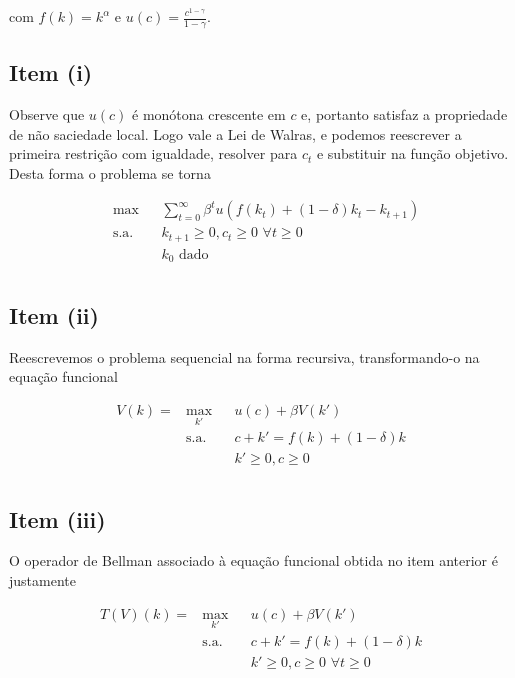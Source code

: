 \documentclass{article}
\begin{document}
com $f(k) = k^\alpha$ e $u(c) = \frac{c^{1-\gamma}}{1-\gamma}$.


\subsection*{Item (i)}

Observe que $u(c)$ é monótona crescente em $c$ e, portanto satisfaz a propriedade de não saciedade local.
Logo vale a Lei de Walras, e podemos reescrever a primeira restrição com igualdade,
resolver para $c_t$ e substituir na função objetivo. Desta forma o problema se torna 

\begin{equation}
\begin{aligned}
& \max & & \sum_{t=0}^{\infty} \beta^t u(f(k_t) + (1-\delta) k_t - k_{t+1}) \\
& \text{s.a.} & &  k_{t+1} \geq 0, c_t \geq 0 \,\, \forall t \geq 0  \\
& & &  k_0 \text{ dado} \\
\end{aligned}
\end{equation}

\subsection*{Item (ii)}

Reescrevemos o problema sequencial na forma recursiva, transformando-o na equação funcional

\begin{equation}
\begin{aligned}
V(k) = & \max_{k'} & & u(c) + \beta V(k') \\
& \text{s.a.} & &  c + k' = f(k) + (1-\delta) k \\
& & &  k' \geq 0, c \geq 0 \,\, \\
\end{aligned}
\end{equation}

\subsection*{Item (iii)}

O operador de Bellman associado à equação funcional obtida no item anterior é justamente

\begin{equation}
\begin{aligned}
T(V)(k) = & \max_{k'} & & u(c) + \beta V(k') \\
& \text{s.a.} & &  c + k' = f(k) + (1-\delta) k \\
& & &  k' \geq 0, c \geq 0 \,\, \forall t \geq 0  \\
\end{aligned}
\end{equation}
\end{document}
